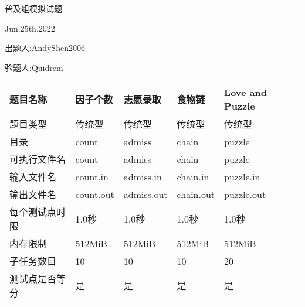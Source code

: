 \documentclass[final,11pt,oneside,UTF8]{report}
\begin{document}
\centerline{\LARGE{普及组模拟试题}}
\centerline{}
\centerline{\LARGE{Jun.25th.2022}}
\centerline{}
\centerline{出题人:AndyShen2006}
\centerline{验题人:Quidrem}
\centerline{}
\begin{table}[h]
    \centering
    \begin{tabular}{lllll}
        \hline
        \multicolumn{1}{|l|}{题目名称}       & \multicolumn{1}{l|}{因子个数}      & \multicolumn{1}{l|}{志愿录取}       & \multicolumn{1}{l|}{食物链}       & \multicolumn{1}{l|}{Love and Puzzle} \\ \hline
        \multicolumn{1}{|l|}{题目类型}       & \multicolumn{1}{l|}{传统型}       & \multicolumn{1}{l|}{传统型}        & \multicolumn{1}{l|}{传统型}       & \multicolumn{1}{l|}{传统型}             \\ \hline
        \multicolumn{1}{|l|}{目录}         & \multicolumn{1}{l|}{count}     & \multicolumn{1}{l|}{admiss}     & \multicolumn{1}{l|}{chain}     & \multicolumn{1}{l|}{puzzle}          \\ \hline
        \multicolumn{1}{|l|}{可执行文件名}     & \multicolumn{1}{l|}{count}     & \multicolumn{1}{l|}{admiss}     & \multicolumn{1}{l|}{chain}     & \multicolumn{1}{l|}{puzzle}          \\ \hline
        \multicolumn{1}{|l|}{输入文件名}      & \multicolumn{1}{l|}{count.in}  & \multicolumn{1}{l|}{admiss.in}  & \multicolumn{1}{l|}{chain.in}  & \multicolumn{1}{l|}{puzzle.in}       \\ \hline
        \multicolumn{1}{|l|}{输出文件名}      & \multicolumn{1}{l|}{count.out} & \multicolumn{1}{l|}{admiss.out} & \multicolumn{1}{l|}{chain.out} & \multicolumn{1}{l|}{puzzle.out}      \\ \hline
        \multicolumn{1}{|l|}{每个测试点时限}    & \multicolumn{1}{l|}{1.0秒}      & \multicolumn{1}{l|}{1.0秒}       & \multicolumn{1}{l|}{1.0秒}      & \multicolumn{1}{l|}{1.0秒}            \\ \hline
        \multicolumn{1}{|l|}{内存限制}       & \multicolumn{1}{l|}{512MiB}    & \multicolumn{1}{l|}{512MiB}     & \multicolumn{1}{l|}{512MiB}    & \multicolumn{1}{l|}{512MiB}          \\ \hline
        \multicolumn{1}{|l|}{子任务数目}      & \multicolumn{1}{l|}{10}        & \multicolumn{1}{l|}{10}         & \multicolumn{1}{l|}{10}        & \multicolumn{1}{l|}{20}              \\ \hline
        \multicolumn{1}{|l|}{测试点是否等分}    & \multicolumn{1}{l|}{是}         & \multicolumn{1}{l|}{是}          & \multicolumn{1}{l|}{是}         & \multicolumn{1}{l|}{是}               \\ \hline

\end{tabular}
\end{table}
\end{document}
